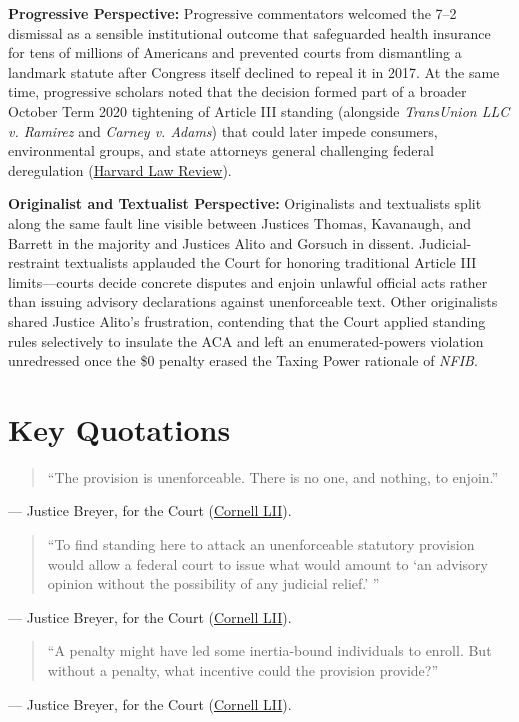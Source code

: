 \documentclass[12pt]{article}
\begin{document}
\textbf{Progressive Perspective:} Progressive commentators welcomed the 7--2 dismissal as a sensible institutional outcome that safeguarded health insurance for tens of millions of Americans and prevented courts from dismantling a landmark statute after Congress itself declined to repeal it in 2017. At the same time, progressive scholars noted that the decision formed part of a broader October Term 2020 tightening of Article III standing (alongside \textit{TransUnion LLC v. Ramirez} and \textit{Carney v. Adams}) that could later impede consumers, environmental groups, and state attorneys general challenging federal deregulation (\href{https://harvardlawreview.org/print/vol-135/california-v-texas/}{Harvard Law Review}).

\textbf{Originalist and Textualist Perspective:} Originalists and textualists split along the same fault line visible between Justices Thomas, Kavanaugh, and Barrett in the majority and Justices Alito and Gorsuch in dissent. Judicial-restraint textualists applauded the Court for honoring traditional Article III limits---courts decide concrete disputes and enjoin unlawful official acts rather than issuing advisory declarations against unenforceable text. Other originalists shared Justice Alito's frustration, contending that the Court applied standing rules selectively to insulate the ACA and left an enumerated-powers violation unredressed once the \$0 penalty erased the Taxing Power rationale of \textit{NFIB}.

\section{Key Quotations}

\begin{quote}
``The provision is unenforceable. There is no one, and nothing, to enjoin.''
\end{quote}
\noindent --- Justice Breyer, for the Court (\href{https://www.law.cornell.edu/supremecourt/text/19-840}{Cornell LII}).

\begin{quote}
``To find standing here to attack an unenforceable statutory provision would allow a federal court to issue what would amount to `an advisory opinion without the possibility of any judicial relief.' ''
\end{quote}
\noindent --- Justice Breyer, for the Court (\href{https://www.law.cornell.edu/supremecourt/text/19-840}{Cornell LII}).

\begin{quote}
``A penalty might have led some inertia-bound individuals to enroll. But without a penalty, what incentive could the provision provide?''
\end{quote}
\noindent --- Justice Breyer, for the Court (\href{https://www.law.cornell.edu/supremecourt/text/19-840}{Cornell LII}).
\end{document}
